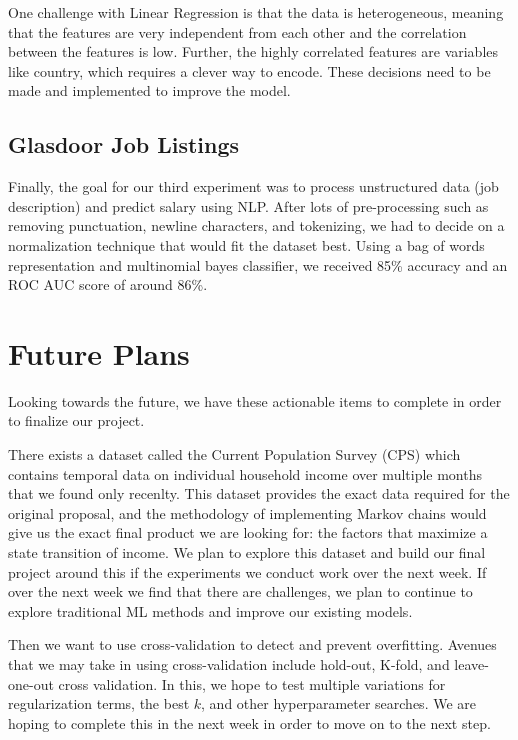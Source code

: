 \documentclass{article}
\begin{document}
One challenge with Linear Regression is that the data is heterogeneous, meaning that the features are very independent from each other and the correlation between the features is low. Further, the highly correlated features are variables like country, which requires a clever way to encode. These decisions need to be made and implemented to improve the model.

\subsection{Glasdoor Job Listings}

Finally, the goal for our third experiment was to process unstructured data (job description) and predict salary using NLP. After lots of pre-processing such as removing punctuation, newline characters, and tokenizing, we had to decide on a normalization technique that would fit the dataset best. Using a bag of words representation and multinomial bayes classifier, we received 85\% accuracy and an ROC AUC score of around 86\%.

\section{Future Plans}

Looking towards the future, we have these actionable items to complete in order to finalize our project.

There exists a dataset called the Current Population Survey (CPS) which contains temporal data on individual household income over multiple months that we found only recenlty. This dataset provides the exact data required for the original proposal, and the methodology of implementing Markov chains would give us the exact final product we are looking for: the factors that maximize a state transition of income. We plan to explore this dataset and build our final project around this if the experiments we conduct work over the next week. If over the next week we find that there are challenges, we plan to continue to explore traditional ML methods and improve our existing models.

Then we want to use cross-validation to detect and prevent overfitting. Avenues that we may take in using cross-validation include hold-out, K-fold, and leave-one-out cross validation. In this, we hope to test multiple variations for regularization terms, the best $k$, and other hyperparameter searches. We are hoping to complete this in the next week in order to move on to the next step. 
\end{document}
